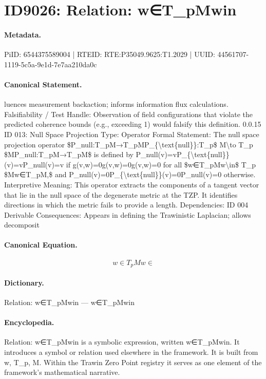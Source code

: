 \section*{ID9026: Relation: w∈T\_pMwin}
\paragraph{Metadata.}
PiID: 6544375589004 | RTEID: RTE:P35049.9625:T1.2029 | UUID: 44561707-1119-5c5a-9e1d-7e7aa210da0c

\paragraph{Canonical Statement.}
luences measurement backaction; informs information flux calculations. Falsifiability / Test Handle: Observation of field configurations that violate the predicted coherence bounds (e.g., exceeding 1) would falsify this definition. 0.0.15 ID 013: Null Space Projection Type: Operator Formal Statement: The null space projection operator \$P\_null:T\_pM→T\_pMP\_\{\textbackslash{}text\{null\}\}:T\_p\$ M\textbackslash{}to T\_p \$MP\_null:T\_pM→T\_pM\$ is defined by P\_null(v)=vP\_\{\textbackslash{}text\{null\}\}(v)=vP\_null(v)=v if g(v,w)=0g(v,w)=0g(v,w)=0 for all \$w∈T\_pMw\textbackslash{}in\$ T\_p \$Mw∈T\_pM,\$ and P\_null(v)=0P\_\{\textbackslash{}text\{null\}\}(v)=0P\_null(v)=0 otherwise. Interpretive Meaning: This operator extracts the components of a tangent vector that lie in the null space of the degenerate metric at the TZP. It identifies directions in which the metric fails to provide a length. Dependencies: ID 004 Derivable Consequences: Appears in defining the Trawinistic Laplacian; allows decomposit

\paragraph{Canonical Equation.}
\[
w∈T_pMw\in
\]

\paragraph{Dictionary.}
Relation: w∈T\_pMwin — w∈T\_pMwin

\paragraph{Encyclopedia.}
Relation: w∈T\_pMwin is a symbolic expression, written w∈T\_pMwin. It introduces a symbol or relation used elsewhere in the framework. It is built from w, T\_p, M. Within the Trawin Zero Point registry it serves as one element of the framework's mathematical narrative.
